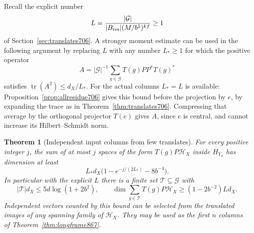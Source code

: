 \documentclass[a4paper,11pt]{article}
\newtheorem{theorem}[proposition]{Theorem}
\theoremstyle{definition}
\theoremstyle{remark}
\numberwithin{equation}{section}
\begin{document}
Recall the explicit number
\[
     L=\frac{|\mathcal G|}
          {|B_{\rm res}|(M/b^5)^{kf}}\ge1
\]
of Section~\ref{sec:translates706}. A stronger moment estimate
can be used in the following argument by replacing \(L\) with
any number \(L_*\ge1\) for which the positive operator
\[
         A=|\mathcal G|^{-1}\sum_{g\in\mathcal G}
                          T(g)PP^*T(g)^*
\]
satisfies \(\operatorname{tr}(A^2)\le d_X/L_*\).
For the actual columns \(L_*=L\) is available:
Proposition~\ref{prop:allresidue706} gives this bound before
the projection by \(e\), by expanding the trace as in
Theorem~\ref{thm:translates706}. Compressing that average by
the orthogonal projector \(T(e)\) gives \(A\), since \(e\) is
central, and cannot increase its Hilbert--Schmidt norm.

\begin{theorem}[Independent input columns from few translates]
\leavevmode\label{thm:fewtranslates868}
For every positive integer \(j\), the sum of at most \(j\)
spaces of the form \(T(g)P\mathcal H_X\) inside \(H_{Y_0}\)
has dimension at least
\begin{equation}
         L_*d_X\big(1-e^{-j/(2L_*)}-8b^{-4}\big).
 \label{eq:fewtranslates868}
\end{equation}
In particular with the explicit \(L\) there is a finite
set \(\mathcal T\subseteq\mathcal G\) with
\[
 |\mathcal T|d_X\le5d\log(1+2b^2),\qquad
 \dim\sum_{g\in\mathcal T} T(g)P\mathcal H_X
                             \ge (1-2b^{-2})L d_X .
\]
Independent vectors counted by this bound can be selected from
the translated images of any spanning family of \(\mathcal H_X\).
They may be used as the first \(n\) columns of
Theorem~\ref{thm:longframe867}.
\end{theorem}
\end{document}
